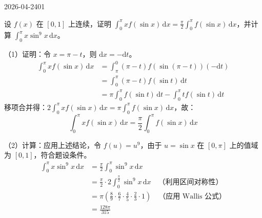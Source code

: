 \begin{mistake}{2026-04-24}{01}

\begin{problemcontent}
设 \(f(x)\) 在 \([0, 1]\) 上连续，证明 \(\int_{0}^{\pi} xf(\sin x)\,\mathrm{d}x = \frac{\pi}{2}\int_{0}^{\pi} f(\sin x)\,\mathrm{d}x\)，并计算 \(\int_{0}^{\pi} x\sin^9 x\,\mathrm{d}x\)。
\end{problemcontent}

\begin{solutioncontent}
（1）证明：令 \(x = \pi - t\)，则 \(\mathrm{d}x = -\mathrm{d}t\)。
\[
\begin{aligned}
\int_{0}^{\pi} xf(\sin x)\,\mathrm{d}x &= \int_{\pi}^{0} (\pi - t)f(\sin(\pi - t))(-\mathrm{d}t) \\
&= \int_{0}^{\pi} (\pi - t)f(\sin t)\,\mathrm{d}t \\
&= \pi \int_{0}^{\pi} f(\sin t)\,\mathrm{d}t - \int_{0}^{\pi} tf(\sin t)\,\mathrm{d}t
\end{aligned}
\]
移项合并得：\(2\int_{0}^{\pi} xf(\sin x)\,\mathrm{d}x = \pi \int_{0}^{\pi} f(\sin x)\,\mathrm{d}x\)，故：
\[ \int_{0}^{\pi} xf(\sin x)\,\mathrm{d}x = \frac{\pi}{2}\int_{0}^{\pi} f(\sin x)\,\mathrm{d}x \]

（2）计算：应用上述结论，令 \(f(u) = u^9\)，由于 \(u=\sin x\) 在 \([0,\pi]\) 上的值域为 \([0,1]\)，符合题设条件。
\[
\begin{aligned}
\int_{0}^{\pi} x\sin^9 x\,\mathrm{d}x &= \frac{\pi}{2}\int_{0}^{\pi} \sin^9 x\,\mathrm{d}x \\
&= \frac{\pi}{2} \cdot 2\int_{0}^{\frac{\pi}{2}} \sin^9 x\,\mathrm{d}x \quad \text{（利用区间对称性）}\\
&= \pi \left( \frac{8}{9} \cdot \frac{6}{7} \cdot \frac{4}{5} \cdot \frac{2}{3} \cdot 1 \right) \quad \text{（应用 Wallis 公式）}\\
&= \frac{128\pi}{315}
\end{aligned}
\]
\end{solutioncontent}


\end{mistake}
